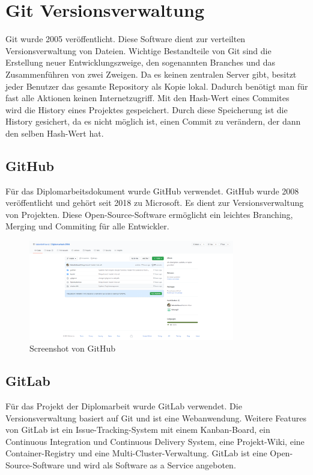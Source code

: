 \section{Git Versionsverwaltung}
Git wurde 2005 veröffentlicht. Diese Software dient zur verteilten Versionsverwaltung von Dateien. Wichtige Bestandteile von Git sind die Erstellung neuer Entwicklungszweige, den sogenannten Branches und das Zusammenführen von zwei Zweigen. Da es keinen zentralen Server gibt, besitzt jeder Benutzer das gesamte Repository als Kopie lokal. Dadurch benötigt man für fast alle Aktionen keinen Internetzugriff. Mit den Hash-Wert eines Commites wird die History eines Projektes gespeichert. Durch diese Speicherung ist die History gesichert, da es nicht möglich ist, einen Commit zu verändern, der dann den selben Hash-Wert hat. \autocite{wikiGit}

\subsection{GitHub}
Für das Diplomarbeitsdokument wurde GitHub verwendet. GitHub wurde 2008 veröffentlicht und gehört seit 2018 zu Microsoft. Es dient zur Versionsverwaltung von Projekten. Diese Open-Source-Software ermöglicht ein leichtes Branching, Merging und Commiting für alle Entwickler. \autocite{wikiGitHub}

\begin{figure}[h]
	\centerline{
		\includegraphics[width=0.8\textwidth]{./grafiken/github_screen.png}
	}
	\vskip0pt
	\caption{Screenshot von GitHub} \label{fig:github}
\end{figure}

\subsection{GitLab}
Für das Projekt der Diplomarbeit wurde GitLab verwendet. Die Versionsverwaltung basiert auf Git und ist eine Webanwendung. Weitere Features von GitLab ist ein Issue-Tracking-System mit einem Kanban-Board, ein Continuous Integration und Continuous Delivery System, eine Projekt-Wiki, eine Container-Registry und eine Multi-Cluster-Verwaltung. GitLab ist eine Open-Source-Software und wird als Software as a Service angeboten. \autocite{wikiGitLab}

